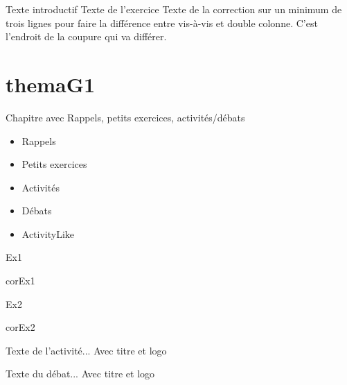\documentclass[nocrop]{sesamanuel}
\begin{document}
  \cours  
  \begin{methode}
    Texte introductif
    \exercice
    Texte de l’exercice
    \correction
    Texte de la correction sur un minimum de trois lignes pour faire la
    différence entre vis-à-vis et double colonne. C’est l’endroit de la
    coupure qui va différer.
  \end{methode}


\themaG

\chapter{themaG1}
\begin{prerequis}[Prérequis - G1]
  Chapitre avec Rappels, petits exercices, activités/débats
  \begin{itemize}
  \item Rappels
  \item Petits exercices
  \item Activités
  \item Débats
  \item ActivityLike
  \end{itemize}
\end{prerequis}

\begin{autoeval}  
    \begin{exercice}
      Ex1
    \end{exercice}
    \begin{corrige}
      corEx1
    \end{corrige}
    \begin{exercice}
      Ex2
    \end{exercice}
    \begin{corrige}
      corEx2
    \end{corrige}
\end{autoeval}

\activites
\begin{activite}
  Texte de l’activité... Avec titre et logo
\end{activite}
\begin{debat}
  Texte du débat... Avec titre et logo
\end{debat}
\end{document}
